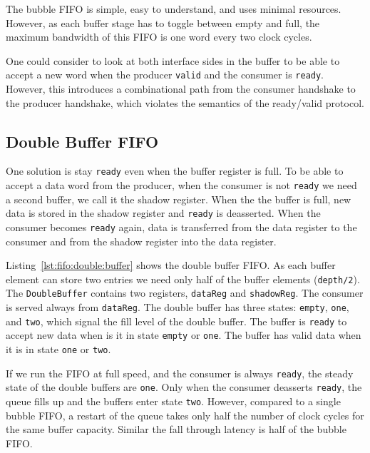 \documentclass[%
    10pt,
    headinclude, footexclude,
    openright, %
    notitlepage,
    cleardoubleempty,
    headsepline,
    pointlessnumbers,
    bibtotoc, idxtotoc,
    ]{scrbook}
\newcommand{\code}[1]{{\small{\texttt{#1}}}}
\begin{document}
The bubble FIFO is simple, easy to understand, and uses minimal resources.
However, as each buffer stage has to toggle between empty and full, the maximum
bandwidth of this FIFO is one word every two clock cycles.

One could consider to look at both interface sides in the buffer to be able to accept
a new word when the producer \code{valid} and the consumer is \code{ready}.
However, this introduces a combinational path from the consumer handshake
to the producer handshake, which violates the semantics of the ready/valid protocol.

\subsection{Double Buffer FIFO}


One solution is stay \code{ready} even when the buffer register is full.
To be able to accept a data word from the producer, when the consumer is not
\code{ready} we need a second buffer, we call it the shadow register.
When the the buffer is full, new data is stored in the shadow register and \code{ready}
is deasserted. When the consumer becomes \code{ready} again, data is transferred
from the data register to the consumer and from the shadow register into
the data register.

\newpage
{}


Listing~\ref{lst:fifo:double:buffer} shows the double buffer FIFO. As each buffer element
can store two entries we need only half of the buffer elements (\code{depth/2}).
The \code{DoubleBuffer} contains two registers,
\code{dataReg} and \code{shadowReg}. The consumer is served always from
\code{dataReg}. The double buffer has three states: \code{empty}, \code{one},
and \code{two}, which signal the fill level of the double buffer.
The buffer is \code{ready} to accept new data when is it in state \code{empty}
or \code{one}. The buffer has valid data when it is in state \code{one} or \code{two}.

If we run the FIFO at full speed, and the consumer is always \code{ready},
the steady state of the double buffers are \code{one}. Only when the consumer
deasserts \code{ready}, the queue fills up and the buffers enter state \code{two}.
However, compared to a single bubble FIFO, a restart of the queue takes
only half the number of clock cycles for the same buffer capacity.
Similar the fall through latency is half of the bubble FIFO.
\end{document}
